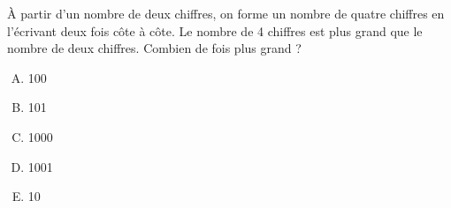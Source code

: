 \`A partir d'un nombre de deux chiffres, on forme un nombre de quatre
chiffres en l'écrivant deux fois côte à côte. Le nombre de 4 chiffres
est plus grand que le nombre de deux chiffres. Combien de fois plus
grand ?
\begin{multicols}{5}
  \begin{enumerate}[A)]
  \item 100
  \item 101
  \item 1000
  \item 1001
  \item 10
  \end{enumerate}
\end{multicols}